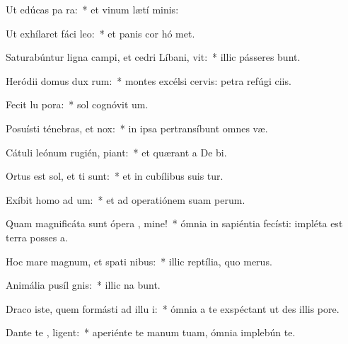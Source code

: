 \item Ut edúcas pa  ra:~* et vinum lætí  minis:
\item Ut exhílaret fáci  leo:~* et panis cor hó met.
\item Saturabúntur ligna campi, et cedri Líbani,  vit:~* illic pásseres bunt.
\item Heródii domus dux  rum:~* montes excélsi cervis: petra refúgi ciis.
\item Fecit lu  pora:~* sol cognóvit  um.
\item Posuísti ténebras, et   nox:~* in ipsa pertransíbunt omnes  væ.
\item Cátuli leónum rugién,  piant:~* et quærant a De  bi.
\item Ortus est sol, et ti sunt:~* et in cubílibus suis tur.
\item Exíbit homo ad  um:~* et ad operatiónem suam   perum.
\item Quam magnificáta sunt ópera , mine!~* ómnia in sapiéntia fecísti: impléta est terra posses a.
\item Hoc mare magnum, et spati nibus:~* illic reptília, quo   merus.
\item Animália pusíl  gnis:~* illic na bunt.
\item Draco iste, quem formásti ad illu i:~* ómnia a te exspéctant ut des illis   pore.
\item Dante te , ligent:~* aperiénte te manum tuam, ómnia implebún te.
